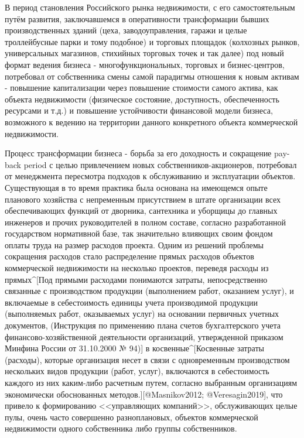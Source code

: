 В период становления Российского рынка недвижимости, с его самостоятельным путём развития, заключавшемся в оперативности трансформации бывших производственных зданий (цеха, заводоуправления, гаражи и целые троллейбусные парки и тому подобное) и торговых площадок (колхозных рынков, универсальных магазинов, стихийных торговых точек и так далее) под новый формат ведения бизнеса - многофункциональных, торговых и бизнес-центров, потребовал от собственника смены самой парадигмы отношения к новым активам - повышение капитализации через повышение стоимости самого актива, как объекта недвижимости (физическое состояние, доступность, обеспеченность ресурсами и т.д.) и повышение устойчивости финансовой модели бизнеса, возможного к ведению на территории данного конкретного объекта коммерческой недвижимости.

Процесс трансформации бизнеса - борьба за его доходность и сокращение pay-back period с целью привлечением новых собственников-акционеров, потребовал от менеджмента пересмотра подходов к обслуживанию и эксплуатации объектов. Существующая в то время практика была основана на имеющемся опыте планового хозяйства с непременным присутствием в штате организации всех обеспечивающих функций от дворника, сантехника и уборщицы до главных инженеров и прочих руководителей в полном составе, согласно разработанной государством нормативной базе, так значительно влияющих своим фондом оплаты труда на размер расходов проекта. Одним из решений проблемы сокращения расходов стало распределение прямых расходов объектов коммерческой недвижимости на несколько проектов, переведя расходы из прямых^[Под прямыми расходами понимаются затраты, непосредственно связанные с производством продукции (выполнением работ, оказанием услуг), и включаемые в себестоимость единицы учета производимой продукции (выполняемых работ, оказываемых услуг) на основании первичных учетных документов, (Инструкция по применению плана счетов бухгалтерского учета финансово-хозяйственной деятельности организаций, утвержденной приказом Минфина России от 31.10.2000 № 94)] в косвенные^[Косвенные затраты (расходы), которые организация несет в связи с одновременным производством нескольких видов продукции (работ, услуг), включаются в себестоимость каждого из них каким-либо расчетным путем, согласно выбранным организациям экономически обоснованных методов.][@Masnikov2012; @Veresagin2019], что привело к формированию  <<управляющих компаний>>, обслуживающих целые пулы, очень часто совершенно разноплановых, объектов коммерческой недвижимости одного собственника либо группы собственников.


